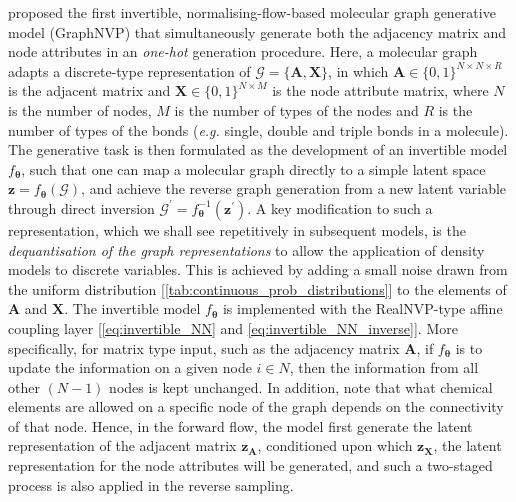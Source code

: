 \citet{madhawa2019graphnvp} proposed the first invertible, normalising-flow-based molecular graph generative model (GraphNVP) that simultaneously generate both the adjacency matrix and node attributes in an \emph{one-hot} generation procedure. Here, a molecular graph adapts a discrete-type representation of $\mathcal{G}=\{\bm{A},\bm{X}\}$, in which $\bm{A}\in\{0,1\}^{N\times N\times R}$ is the adjacent matrix and $\bm{X}\in\{0,1\}^{N\times M}$ is the node attribute matrix, where $N$ is the number of nodes, $M$ is the number of types of the nodes and $R$ is the number of types of the bonds (\emph{e.g.} single, double and triple bonds in a molecule). The generative task is then formulated as the development of an invertible model $f_{\boldsymbol{\theta}}$, such that one can map a molecular graph directly to a simple latent space $\bm{z}=f_{\boldsymbol{\theta}}(\mathcal{G})$, and achieve the reverse graph generation from a new latent variable through direct inversion  $\mathcal{G}^\prime=f_{\boldsymbol{\theta}}^{-1}(\bm{z}^\prime)$. A key modification to such a representation, which we shall see repetitively in subsequent models, is the \emph{dequantisation of the graph representations} to allow the application of density models to discrete variables. This is achieved by adding a small noise drawn from the uniform distribution [\cref{tab:continuous_prob_distributions}] to the elements of $\bm{A}$ and $\bm{X}$. The invertible model  $f_{\boldsymbol{\theta}}$ is implemented with the RealNVP\cite{dinh2016density}-type affine coupling layer [\cref{eq:invertible_NN} and \cref{eq:invertible_NN_inverse}]. More specifically, for matrix type input, such as the adjacency matrix $\bm{A}$, if $f_{\boldsymbol{\theta}}$ is to update the information on a given node $i\in N$, then the information from all other $(N-1)$ nodes is kept unchanged. In addition, note that what chemical elements are allowed on a specific node of the graph depends on the connectivity of that node. Hence, in the forward flow, the model first generate the latent representation of the adjacent matrix $\bm{z}_{\bm{A}}$, conditioned upon which $\bm{z}_{\bm{X}}$, the latent representation for the node attributes will be generated, and such a two-staged process is also applied in the reverse sampling. 

